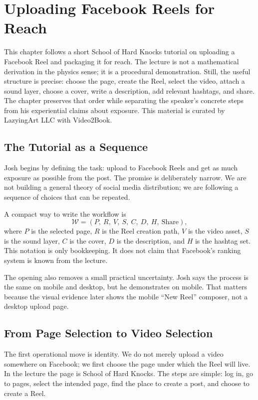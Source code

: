 \chapter{Uploading Facebook Reels for Reach}

This chapter follows a short School of Hard Knocks tutorial on uploading a Facebook Reel and packaging it for reach. The lecture is not a mathematical derivation in the physics sense; it is a procedural demonstration. Still, the useful structure is precise: choose the page, create the Reel, select the video, attach a sound layer, choose a cover, write a description, add relevant hashtags, and share. The chapter preserves that order while separating the speaker's concrete steps from his experiential claims about exposure. This material is curated by LazyingArt LLC with Video2Book.

\section{The Tutorial as a Sequence}

Josh begins by defining the task: upload to Facebook Reels and get as much exposure as possible from the post. The promise is deliberately narrow. We are not building a general theory of social media distribution; we are following a sequence of choices that can be repeated.

A compact way to write the workflow is
\begin{equation}
\mathcal{W}
=
(P,\ R,\ V,\ S,\ C,\ D,\ H,\ \mathrm{Share}),
\end{equation}
where \(P\) is the selected page, \(R\) is the Reel creation path, \(V\) is the video asset, \(S\) is the sound layer, \(C\) is the cover, \(D\) is the description, and \(H\) is the hashtag set. This notation is only bookkeeping. It does not claim that Facebook's ranking system is known from the lecture.

The opening also removes a small practical uncertainty. Josh says the process is the same on mobile and desktop, but he demonstrates on mobile. That matters because the visual evidence later shows the mobile ``New Reel'' composer, not a desktop upload page.

\section{From Page Selection to Video Selection}

The first operational move is identity. We do not merely upload a video somewhere on Facebook; we first choose the page under which the Reel will live. In the lecture the page is School of Hard Knocks. The steps are simple: log in, go to pages, select the intended page, find the place to create a post, and choose to create a Reel.

